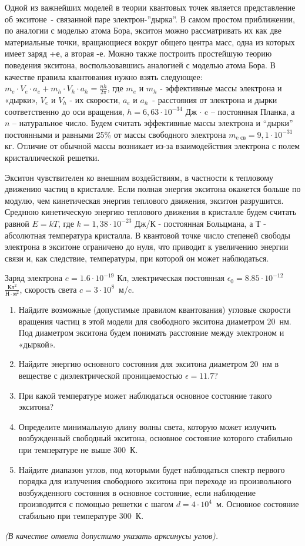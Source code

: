 
Одной из важнейших моделей в теории квантовых точек является представление об экситоне~- 
связанной паре электрон-”дырка”. В самом простом приближении, по аналогии с моделью атома Бора, 
экситон можно рассматривать их как две материальные точки, вращающиеся вокруг общего центра масс, 
одна из которых имеет заряд +е, а вторая -е. Можно также построить простейшую теорию поведения экситона, 
воспользовавшись аналогией с моделью атома Бора. В качестве правила квантования нужно взять следующее: 
${m_e \cdot V_e \cdot a_e + m_h \cdot V_h \cdot a_h=\frac{nh}{2 \pi}}$, где $m_e$ и $m_h$  - эффективные массы электрона 
и «дырки», $V_e$ и $V_h$ - их скорости, $a_e$ и $a_h$~- расстояния от электрона и дырки соответственно 
до оси вращения, $h=6,63 \cdot 10^{-34}$  Дж $\cdot$ c – постоянная Планка, а $n$  – натуральное число. 
Будем считать эффективные массы электрона и “дырки” постоянными и равными 25\% от массы свободного электрона 
$m_{\text{e св}}=9,1 \cdot 10^{-31}$кг. Отличие от обычной массы возникает из-за взаимодействия электрона с полем кристаллической решетки.

Экситон чувствителен ко внешним воздействиям, в частности к тепловому движению частиц в кристалле. 
Если полная энергия экситона окажется больше по модулю, чем кинетическая энергия теплового движения, 
экситон разрушится. Среднюю кинетическую энергию теплового движения в кристалле будем считать равной 
$E=kT$, где $k=1,38 \cdot 10^{-23}$ Дж/К  - постоянная Больцмана, а $Т$ - абсолютная температура кристалла. В квантовой точке число степеней 
свободы электрона в экситоне ограничено до нуля, что приводит к увеличению энергии связи и, 
как следствие, температуры, при которой он может наблюдаться. 

Заряд электрона $e=1.6 \cdot 10^{-19}$ Кл, электрическая постоянная $\epsilon_0=8.85 \cdot 10^{-12}$  $\frac{\text{Кл}^2}{\text{Н} \cdot \text{м}^2}$, скорость 
света $c = 3 \cdot 10^8$~м/c.

\begin{enumerate}
    \item Найдите возможные (допустимые правилом квантования) угловые скорости вращения частиц в этой 
    модели для свободного экситона диаметром 20~нм. Под диаметром экситона будем понимать расстояние 
    между электроном и «дыркой».
    \item Найдите энергию основного состояния для экситона диаметром 20~нм в веществе с диэлектрической проницаемостью $\epsilon=11.7$?
    \item При какой температуре может наблюдаться основное состояние такого экситона?
    \item Определите минимальную длину волны света, которую может излучить возбужденный свободный экситона, основное состояние которого стабильно при температуре не выше 300~К.
    \item Найдите диапазон углов, под которыми будет наблюдаться спектр первого порядка для излучения свободного экситона при переходе из произвольного возбужденного состояния в основное состояние, если наблюдение производится с помощью решетки с шагом $d= 4 \cdot 10^4$~м. 
    Основное состояние стабильно при температуре 300~К.    
\end{enumerate}

\textit{(В качестве ответа допустимо указать арксинусы углов).}